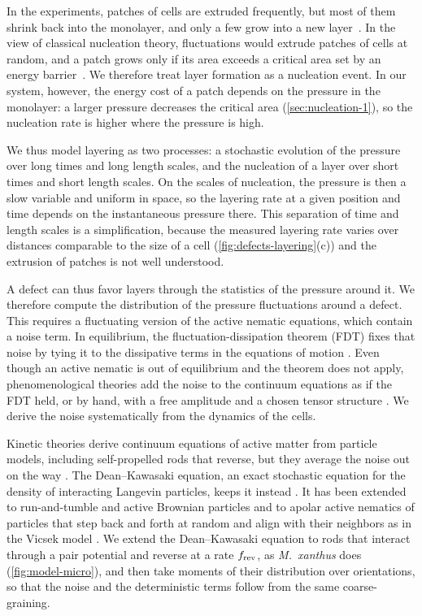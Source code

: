 \documentclass[aps,pre,reprint,superscriptaddress,longbibliography,nofootinbib
]{revtex4-2}
\begin{document}
In the experiments, patches of cells are extruded
frequently, but most of them shrink back into the
monolayer, and only a few grow into a new
layer~\cite{copenhagen2021}. In the view of classical
nucleation theory, fluctuations would extrude patches of
cells at random, and a patch grows only if its area exceeds
a critical area set by an energy
barrier~\cite{debenedetti2020metastable}. We therefore
treat layer formation as a nucleation event. In our system,
however, the energy cost of a patch depends on the pressure
in the monolayer: a larger pressure decreases the critical
area (\cref{sec:nucleation-1}), so the nucleation rate is
higher where the pressure is high.

We thus model layering as two processes: a stochastic
evolution of the pressure over long times and long length
scales, and the nucleation of a layer over short times and
short length scales. On the scales of nucleation, the
pressure is then a slow variable and uniform in space, so
the layering rate at a given position and time depends on
the instantaneous pressure there. This separation of time
and length scales is a simplification, because the measured
layering rate varies over distances comparable to the size
of a cell (\cref{fig:defects-layering}(c)) and the
extrusion of patches is not well understood.

A defect can thus favor layers through the statistics of
the pressure around it. We therefore compute the
distribution of the pressure fluctuations around a defect.
This requires a fluctuating version of the active nematic
equations, which contain a noise term. In equilibrium, the
fluctuation-dissipation theorem (FDT) fixes that noise by
tying it to the dissipative terms in the equations of
motion \cite{kubo1966fluctuation}. Even though an active
nematic is out of equilibrium and the theorem does not
apply, phenomenological theories add the noise to the
continuum equations as if the FDT held, or by hand, with a
free amplitude and a chosen tensor structure
\cite{ramaswamy2003active,mishra2010dynamic,shankar2018low,
marchetti2013hydrodynamics,basu2008thermal}. We derive the
noise systematically from the dynamics of the cells.

Kinetic theories derive continuum equations of active
matter from particle models, including self-propelled rods
that reverse, but they average the noise out on the way
\cite{bertin2006boltzmann,baskaran2008hydrodynamics,
grossmann2016mesoscale,peshkov2012nonlinear}. The
Dean--Kawasaki equation, an exact stochastic equation for
the density of interacting Langevin particles, keeps it
instead
\cite{dean1996,kawasaki1994stochastic,illien2025dean}. It
has been extended to run-and-tumble and active Brownian
particles \cite{tailleur2008statistical,solon2015active}
and to apolar active nematics of particles that step back
and forth at random and align with their neighbors as in
the Vicsek model \cite{bertin2013}. We extend the
Dean--Kawasaki equation to rods that interact through a
pair potential and reverse at a rate $f_{\rm rev}$, as
\textit{M.\ xanthus} does (\cref{fig:model-micro}), and
then take moments of their distribution over orientations,
so that the noise and the deterministic terms follow from
the same coarse-graining.
\end{document}
